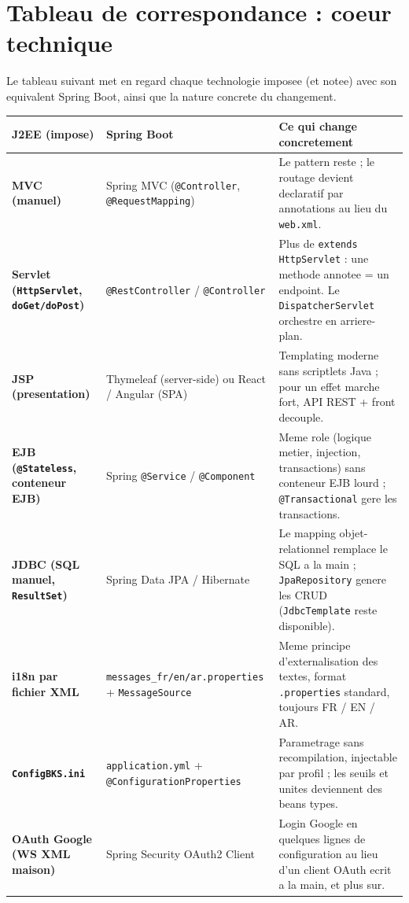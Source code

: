 \section{Tableau de correspondance : coeur technique}
Le tableau suivant met en regard chaque technologie imposee (et notee) avec son
equivalent Spring Boot, ainsi que la nature concrete du changement.

\begin{longtable}{>{\bfseries}p{3cm} p{3.4cm} p{7.2cm}}
\toprule
\textbf{J2EE (impose)} & \textbf{Spring Boot} & \textbf{Ce qui change concretement} \\
\midrule
\endhead
MVC (manuel) & Spring MVC (\texttt{@Controller}, \texttt{@RequestMapping}) & Le pattern reste ; le routage devient declaratif par annotations au lieu du \texttt{web.xml}. \\
Servlet (\texttt{HttpServlet}, \texttt{doGet/doPost}) & \texttt{@RestController} / \texttt{@Controller} & Plus de \texttt{extends HttpServlet} : une methode annotee = un endpoint. Le \texttt{DispatcherServlet} orchestre en arriere-plan. \\
JSP (presentation) & Thymeleaf (server-side) ou React / Angular (SPA) & Templating moderne sans scriptlets Java ; pour un effet marche fort, API REST + front decouple. \\
EJB (\texttt{@Stateless}, conteneur EJB) & Spring \texttt{@Service} / \texttt{@Component} & Meme role (logique metier, injection, transactions) sans conteneur EJB lourd ; \texttt{@Transactional} gere les transactions. \\
JDBC (SQL manuel, \texttt{ResultSet}) & Spring Data JPA / Hibernate & Le mapping objet-relationnel remplace le SQL a la main ; \texttt{JpaRepository} genere les CRUD (\texttt{JdbcTemplate} reste disponible). \\
i18n par fichier XML & \texttt{messages\_fr/en/ar.properties} + \texttt{MessageSource} & Meme principe d'externalisation des textes, format \texttt{.properties} standard, toujours FR / EN / AR. \\
\texttt{ConfigBKS.ini} & \texttt{application.yml} + \texttt{@ConfigurationProperties} & Parametrage sans recompilation, injectable par profil ; les seuils et unites deviennent des beans types. \\
OAuth Google (WS XML maison) & Spring Security OAuth2 Client & Login Google en quelques lignes de configuration au lieu d'un client OAuth ecrit a la main, et plus sur. \\

\end{longtable}
